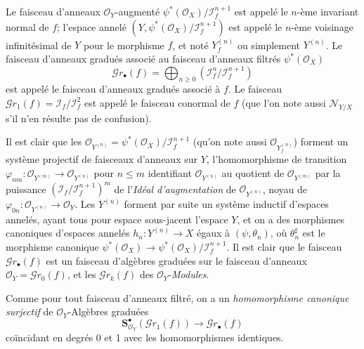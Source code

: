 \begin{definition}[16.1.2]
Le faisceau d'anneaux $\mathcal{O}_Y$-augmenté
$\psi^*(\mathcal{O}_X)/\mathscr{I}_f^{n+1}$ est appelé le $n$-ème \textup{invariant normal}
de $f$; l'espace annelé
$(Y,\psi^*(\mathcal{O}_X)/\mathscr{I}_f^{n+1})$ est appelé le $n$-ème \textup{voisinage
infinitésimal de} $Y$ pour le morphisme $f$, et noté $Y_f^{(n)}$ ou simplement
$Y^{(n)}$. Le faisceau d'anneaux gradués associé au faisceau d'anneaux filtrés
$\psi^*(\mathcal{O}_X)$
\[
  \mathscr{G}r_\bullet(f)=\bigoplus_{n\geq 0}
  (\mathscr{I}_f^n/\mathscr{I}_f^{n+1})
  \tag{16.1.2.1}
  \label{IV.16.1.2.1}
\]
est appelé le faisceau d'anneaux gradués \textup{associé à} $f$. Le faisceau
$\mathscr{G}r_1(f)=\mathscr{I}_f/\mathscr{I}_f^2$ est appelé le \textup{faisceau conormal}
de $f$ \textup{(que l'on note aussi $\mathscr{N}_{Y/X}$ s'il n'en résulte pas de confusion)}.
\end{definition}

Il est clair que les
$\mathcal{O}_{Y^{(n)}}=\psi^*(\mathcal{O}_X)/\mathscr{I}_f^{n+1}$
(qu'on note aussi $\mathcal{O}_{Y_f^{(n)}}$) forment un
système projectif de faisceaux d'anneaux sur $Y$, l'homomorphisme de transition
$\varphi_{nm}:\mathcal{O}_{Y^{(m)}}\to\mathcal{O}_{Y^{(n)}}$ pour $n\leq m$
identifiant $\mathcal{O}_{Y^{(n)}}$ au quotient de $\mathcal{O}_{Y^{(m)}}$ par la
puissance $(\mathscr{I}_f/\mathscr{I}_f^{n+1})^m$ de l'\emph{Idéal d'augmentation} de
$\mathcal{O}_{Y^{(n)}}$, noyau de
$\varphi_{0n}:\mathcal{O}_{Y^{(n)}}\to\mathcal{O}_Y$. Les $Y^{(n)}$ forment par
suite un système inductif d'espaces annelés, ayant tous pour espace sous-jacent
l'espace $Y$, et on a des morphismes canoniques d'espaces annelés
$h_n:Y^{(n)}\to X$ égaux à $(\psi,\theta_n)$, où $\theta_n^\sharp$ est le morphisme
canonique
$\psi^*(\mathcal{O}_X)\to\psi^*(\mathcal{O}_X)/\mathscr{I}_f^{n+1}$.
Il est clair que le faisceau $\mathscr{G}r_\bullet(f)$ est un faisceau d'algèbres
graduées sur le faisceau d'anneaux
$\mathcal{O}_Y=\mathscr{G}r_0(f)$, et les $\mathscr{G}r_k(f)$ des
$\mathcal{O}_Y$-\emph{Modules}.

Comme pour tout faisceau d'anneaux filtré, on a un \emph{homomorphisme canonique
surjectif} de $\mathcal{O}_Y$-Algèbres graduées
\[
  \mathbf{S}_{\mathcal{O}_Y}^{\bullet}(\mathscr{G}r_1(f))
  \longrightarrow\mathscr{G}r_\bullet(f)
  \tag{16.1.2.2}
  \label{IV.16.1.2.2}
\]
coïncidant en degrés 0 et 1 avec les homomorphismes identiques.


